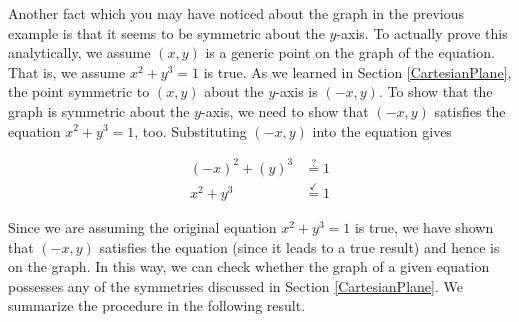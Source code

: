 \smallskip


\smallskip

Another fact which you may have noticed about the graph in the previous example is that it seems to be symmetric about the $y$-axis.  To actually prove this analytically, we assume $(x,y)$ is a generic point on the graph of the equation. That is, we assume  $x^2 + y^3 = 1$ is true.  As we learned in Section \ref{CartesianPlane},  the point symmetric to $(x,y)$ about the $y$-axis is $(-x,y)$.  To show that the graph is symmetric about the $y$-axis, we need to show that $(-x,y)$ satisfies the equation $x^2 + y^3 = 1$, too.  Substituting $(-x,y)$ into the equation gives

\begin{align*}
(-x)^2+(y)^3 & \stackrel{?}{=}  1  \\
   x^2 + y^3 & \stackrel{\checkmark}{=}  1 
\end{align*}

Since we are assuming the original equation $x^2 + y^3 = 1$ is true, we have shown that $(-x, y)$ satisfies the equation (since it leads to a true result) and hence is on the graph.  In this way, we can check whether the graph of a given equation possesses any of the symmetries discussed in Section \ref{CartesianPlane}.  We summarize the procedure in the following result.  

\smallskip

